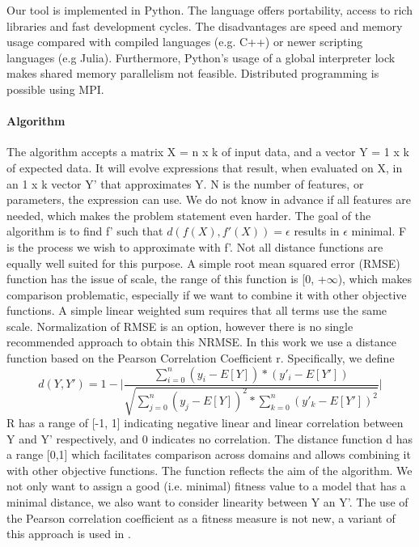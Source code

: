Our tool is implemented in Python. The language offers portability, access to rich libraries and fast development cycles. The disadvantages are speed and memory usage compared with compiled languages (e.g. C++) or newer scripting languages (e.g Julia).
Furthermore, Python's usage of a global interpreter lock makes shared memory parallelism not feasible. Distributed programming is possible using MPI.
\paragraph{Algorithm}
The algorithm accepts a matrix X = n x k of input data, and a vector Y = 1 x k of expected data. It will evolve expressions that result, when evaluated on X, in an 1 x k vector Y' that approximates Y. N is the number of features, or parameters, the expression can use. We do not know in advance if all features are needed, which makes the problem statement even harder.
The goal of the algorithm is to find f' such that $ d(f(X), f'(X))=\epsilon$ results in $\epsilon$ minimal. F is the process we wish to approximate with f'. Not all distance functions are equally well suited for this purpose. A simple root mean squared error (RMSE) function has the issue of scale, the range of this function is [0, +$\infty$), which makes comparison problematic, especially if we want to combine it with other objective functions. A simple linear weighted sum requires that all terms use the same scale.
Normalization of RMSE is an option, however there is no single recommended approach to obtain this NRMSE.
In this work we use a distance function based on the Pearson Correlation Coefficient r. Specifically, we define
\[
d(Y, Y') = 1 - 
\lvert \frac{\sum_{i=0}^{n}{(y_i-E[Y])*(y'_i-E[Y'])}}{\sqrt{\sum_{j=0}^{n}{(y_j-E[Y])^2}*\sum_{k=0}^{n}{(y'_k-E[Y'])^2}}}
\lvert 
\]
R has a range of [-1, 1] indicating negative linear and linear correlation between Y and Y' respectively, and 0 indicates no correlation. The distance function d has a range [0,1] which facilitates comparison across domains and allows combining it with other objective functions. The function reflects the aim of the algorithm. We not only want to assign a good (i.e. minimal) fitness value to a model that has a minimal distance, we also want to consider linearity between Y an Y'. The use of the Pearson correlation coefficient as a fitness measure is not new, a variant of this approach is used in \citep{pearson}.
